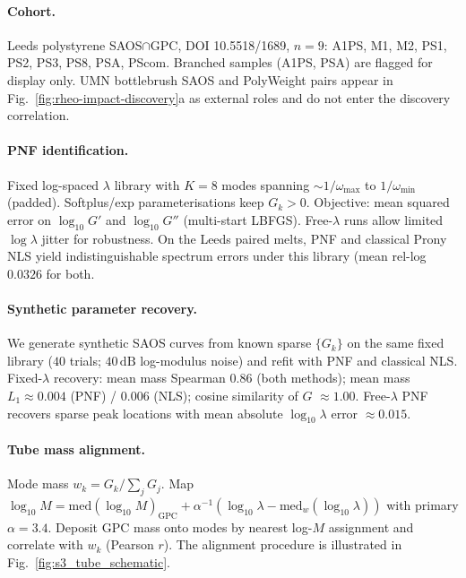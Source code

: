 \documentclass[twocolumn, 10pt]{article}
\begin{document}
\paragraph{Cohort.}
Leeds polystyrene SAOS\(\cap\)GPC, DOI 10.5518/1689, \(n=9\): A1PS, M1, M2, PS1, PS2, PS3, PS8, PSA, PScom\cite{elliott2025}. Branched samples (A1PS, PSA) are flagged for display only. UMN bottlebrush SAOS and PolyWeight pairs appear in Fig.~\ref{fig:rheo-impact-discovery}a as external roles and do not enter the discovery correlation.

\paragraph{PNF identification.}
Fixed log-spaced \(\lambda\) library with \(K=8\) modes spanning \(\sim1/\omega_{\max}\) to \(1/\omega_{\min}\) (padded). Softplus/exp parameterisations keep \(G_k>0\). Objective: mean squared error on \(\log_{10}G'\) and \(\log_{10}G''\) (multi-start LBFGS). Free-\(\lambda\) runs allow limited \(\log\lambda\) jitter for robustness. On the Leeds paired melts, PNF and classical Prony NLS yield indistinguishable spectrum errors under this library (mean rel-log \(0.0326\) for both.

\paragraph{Synthetic parameter recovery.}
We generate synthetic SAOS curves from known sparse \(\{G_k\}\) on the same fixed library (\(40\) trials; \(40\,\mathrm{dB}\) log-modulus noise) and refit with PNF and classical NLS. Fixed-\(\lambda\) recovery: mean mass Spearman \(0.86\) (both methods); mean mass \(L_1\approx0.004\) (PNF) / \(0.006\) (NLS); cosine similarity of \(G\) \(\approx1.00\). Free-\(\lambda\) PNF recovers sparse peak locations with mean absolute \(\log_{10}\lambda\) error \(\approx0.015\).

\paragraph{Tube mass alignment.}
Mode mass \(w_k=G_k/\sum_j G_j\). Map \(\log_{10}M=\mathrm{med}(\log_{10}M)_{\mathrm{GPC}}+\alpha^{-1}(\log_{10}\lambda-\mathrm{med}_w(\log_{10}\lambda))\) with primary \(\alpha=3.4\)\cite{doi1986}. Deposit GPC mass onto modes by nearest log-\(M\) assignment and correlate with \(w_k\) (Pearson \(r\)). The alignment procedure is illustrated in Fig.~\ref{fig:s3_tube_schematic}.
\end{document}
